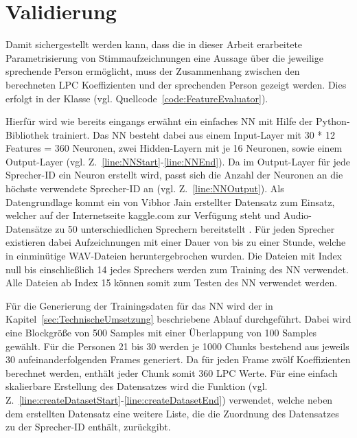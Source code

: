 \section{Validierung}\label{sec:Validierung}
Damit sichergestellt werden kann, dass die in dieser Arbeit erarbeitete Parametrisierung von Stimmaufzeichnungen eine Aussage über die jeweilige sprechende Person ermöglicht, muss der Zusammenhang zwischen den berechneten \ac{LPC} Koeffizienten und der sprechenden Person gezeigt werden.
Dies erfolgt in der Klasse  (vgl. Quellcode~\ref{code:FeatureEvaluator}).

Hierfür wird wie bereits eingangs erwähnt ein einfaches \ac{NN} mit Hilfe der Python-Bibliothek  trainiert.
Das \ac{NN} besteht dabei aus einem Input-Layer mit 30 * 12 Features = 360 Neuronen, zwei Hidden-Layern mit je 16 Neuronen, sowie einem Output-Layer (vgl. Z.~\ref{line:NNStart}-\ref{line:NNEnd}).
Da im Output-Layer für jede Sprecher-ID ein Neuron erstellt wird, passt sich die Anzahl der Neuronen an die höchste verwendete Sprecher-ID an (vgl. Z.~\ref{line:NNOutput}).
\newline
\newline
Als Datengrundlage kommt ein von Vibhor Jain erstellter Datensatz zum Einsatz, welcher auf der Internetseite kaggle.com zur Verfügung steht und Audio-Datensätze zu 50 unterschiedlichen Sprechern bereitstellt \autocite[vgl.][]{vibhor_jain_speaker_2019}.
Für jeden Sprecher existieren dabei Aufzeichnungen mit einer Dauer von bis zu einer Stunde, welche in einminütige WAV-Dateien heruntergebrochen wurden.
Die Dateien mit Index null bis einschließlich 14 jedes Sprechers werden zum Training des \ac{NN} verwendet.
Alle Dateien ab Index 15 können somit zum Testen des \ac{NN} verwendet werden.

Für die Generierung der Trainingsdaten für das \ac{NN} wird der in Kapitel~\ref{sec:TechnischeUmsetzung} beschriebene Ablauf durchgeführt.
Dabei wird eine Blockgröße von 500 Samples mit einer Überlappung von 100 Samples gewählt.
Für die Personen 21 bis 30 werden je 1000 Chunks bestehend aus jeweils 30 aufeinanderfolgenden Frames generiert.
Da für jeden Frame zwölf Koeffizienten berechnet werden, enthält jeder Chunk somit 360 \ac{LPC} Werte.
Für eine einfach skalierbare Erstellung des Datensatzes wird die Funktion  (vgl. Z.~\ref{line:createDatasetStart}-\ref{line:createDatasetEnd}) verwendet, welche neben dem erstellten Datensatz eine weitere Liste, die die Zuordnung des Datensatzes zu der Sprecher-ID enthält, zurückgibt.

